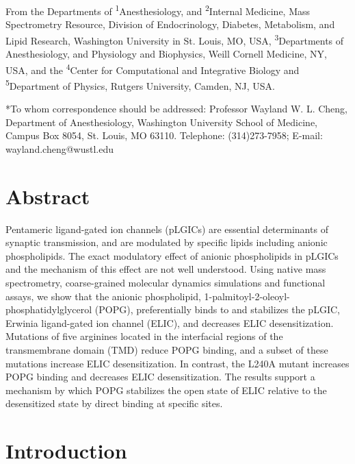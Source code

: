 From the Departments of \textsuperscript{1}Anesthesiology, and
\textsuperscript{2}Internal Medicine, Mass Spectrometry Resource,
Division of Endocrinology, Diabetes, Metabolism, and Lipid Research,
Washington University in St. Louis, MO, USA,
\textsuperscript{3}Departments of Anesthesiology, and Physiology and
Biophysics, Weill Cornell Medicine, NY, USA, and the
\textsuperscript{4}Center for Computational and Integrative Biology and
\textsuperscript{5}Department of Physics, Rutgers University, Camden,
NJ, USA.

*To whom correspondence should be addressed: Professor Wayland W. L.
Cheng, Department of Anesthesiology, Washington University School of
Medicine, Campus Box 8054, St. Louis, MO 63110. Telephone:
(314)273-7958; E-mail: wayland.cheng@wustl.edu

\section{Abstract}

Pentameric ligand-gated ion channels (pLGICs) are essential determinants
of synaptic transmission, and are modulated by specific lipids including
anionic phospholipids. The exact modulatory effect of anionic
phospholipids in pLGICs and the mechanism of this effect are not well
understood. Using native mass spectrometry, coarse-grained molecular
dynamics simulations and functional assays, we show that the anionic
phospholipid, 1-palmitoyl-2-oleoyl-phosphatidylglycerol (POPG),
preferentially binds to and stabilizes the pLGIC, Erwinia ligand-gated
ion channel (ELIC), and decreases ELIC desensitization. Mutations of
five arginines located in the interfacial regions of the transmembrane
domain (TMD) reduce POPG binding, and a subset of these mutations
increase ELIC desensitization. In contrast, the L240A mutant increases
POPG binding and decreases ELIC desensitization. The results support a
mechanism by which POPG stabilizes the open state of ELIC relative to
the desensitized state by direct binding at specific sites.

\section{Introduction}

